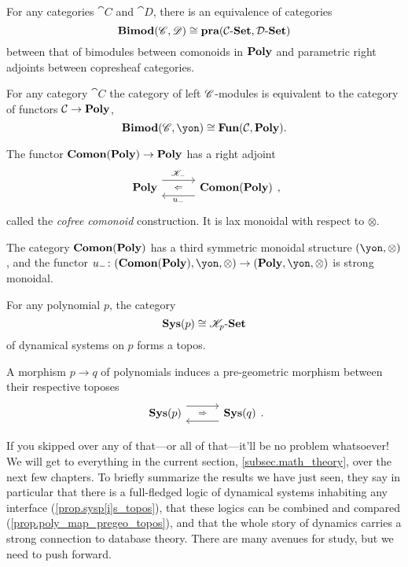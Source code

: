 \documentclass[DynamicalBook]{subfiles}
\begin{document}
\begin{proposition}[Garner]
For any categories $\cat{C}$ and $\cat{D}$, there is an equivalence of categories
\[
\textbf{Bimod}(\mathscr{C},\mathscr{D})\cong\textbf{pra}(\mathcal{C}\textnormal{-}\textbf{Set},\mathcal{D}\textnormal{-}\textbf{Set})
\]
between that of bimodules between comonoids in $\textbf{Poly}$ and parametric right adjoints between copresheaf categories.
\end{proposition}

\begin{proposition}[Niu]
For any category $\cat{C}$ the category of left $\mathscr{C}$-modules is equivalent to the category of functors $\mathcal{C}\to\textbf{Poly}$,
\[\Cat{Bimod}(\com{C},\yon)\cong\Cat{Fun}(\cat{C},\poly).\]
\end{proposition}

\begin{proposition}
The functor $\textbf{Comon}(\textbf{Poly})\to\textbf{Poly}$ has a right adjoint
\[
\adjr{\poly}{\com{K}_-}{u_-}{\comon},
\]
called the \emph{cofree comonoid} construction. It is lax monoidal with respect to $\otimes$.
\end{proposition}

\begin{proposition}
The category $\textbf{Comon}(\textbf{Poly})$ has a third symmetric monoidal structure $(\yon,\otimes)$, and the functor $u_-\colon(\comon,\yon,\otimes)\to(\poly,\yon,\otimes)$ is strong monoidal.
\end{proposition}



\begin{proposition}[Niu]\label{prop.sysp[i]s_topos}
For any polynomial $p$, the category
\[\textbf{Sys}(p)\cong\mathscr{K}_p\textnormal{-}\textbf{Set}\]
of dynamical systems on $p$ forms a topos.
\end{proposition}

\begin{proposition}\label{prop.poly_map_pregeo_topos}
A morphism $p\to q$ of polynomials induces a pre-geometric morphism between their respective toposes
\[
\adj{\sys(p)}{}{}{\sys(q)}.
\]
\end{proposition}

If you skipped over any of that---or all of that---it'll be no problem whatsoever! We will get to everything in the current section, \ref{subsec.math_theory}, over the next few chapters. To briefly summarize the results we have just seen, they say in particular that there is a full-fledged logic of dynamical systems inhabiting any interface (\cref{prop.sysp[i]s_topos}), that these logics can be combined and compared (\cref{prop.poly_map_pregeo_topos}), and that the whole story of dynamics carries a strong connection to database theory. There are many avenues for study, but we need to push forward.
\end{document}
